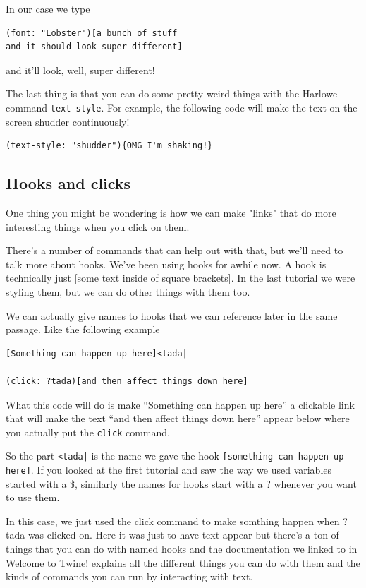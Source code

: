 \documentclass[a5paper,11pt]{article}
\begin{document}
In our case we type
\begin{verbatim}
(font: "Lobster")[a bunch of stuff 
and it should look super different]
\end{verbatim}
and it'll look, well, super different!

The last thing is that you can do some pretty weird things with the Harlowe command \verb"text-style". For example, the following code will make the text on the screen shudder continuously!
\begin{verbatim}
(text-style: "shudder"){OMG I'm shaking!}
\end{verbatim}
\subsection{Hooks and clicks}
One thing you might be wondering is how we can make "links" that do more interesting things when you click on them.

There's a number of commands that can help out with that, but we'll need to talk more about hooks. We've been using hooks for awhile now. A hook is technically just [some text inside of square brackets]. In the last tutorial we were styling them, but we can do other things with them too.

We can actually give names to hooks that we can reference later in the same passage. Like the following example
\begin{verbatim}
[Something can happen up here]<tada|

(click: ?tada)[and then affect things down here]
\end{verbatim}
What this code will do is make ``Something can happen up here'' a clickable link that will make the text ``and then affect things down here'' appear below where you actually put the \verb|click| command.

So the part \verb"<tada|" is the name we gave the hook
\texttt{[something can happen up here]}. If you looked at the first tutorial and saw the way we used variables started with a \$, similarly the names for hooks start with a ? whenever you want to use them.

In this case, we just used the click command to make somthing happen when ?tada was clicked on. Here it was just to have text appear but there's a ton of things that you can do with named hooks and the documentation we linked to in Welcome to Twine! explains all the different things you can do with them and the kinds of commands you can run by interacting with text.
\end{document}
